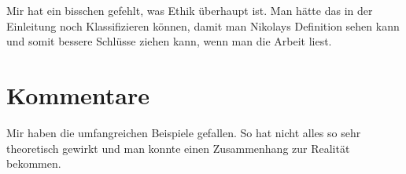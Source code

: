 \documentclass{article}
\begin{document}
Mir hat ein bisschen gefehlt, was Ethik überhaupt ist. Man hätte das in der Einleitung noch Klassifizieren können, damit man Nikolays Definition sehen kann und somit bessere Schlüsse ziehen kann, wenn man die Arbeit liest.

\section{Kommentare}

Mir haben die umfangreichen Beispiele gefallen. So hat nicht alles so sehr theoretisch gewirkt und man konnte einen Zusammenhang zur Realität bekommen.
\end{document}
